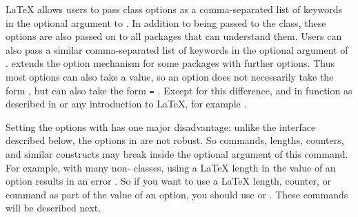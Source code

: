 \begin{Declaration}
\end{Declaration}
\LaTeX{} allows users to pass class options as a
comma-separated list of keywords in the optional argument to
. In addition to being passed to the class, these options
are also passed on to all packages that can
understand them. Users can also pass a similar comma-separated list of
keywords in the optional argument of . \KOMAScript{} extends the option mechanism for
 some packages with further options. Thus most \KOMAScript{} options can also
take a value, so an option does not necessarily take the form ,
but can also take the form \texttt{=}%
. Except for this difference,
 and  in \KOMAScript{} function as
described in \cite{latex:usrguide-historic} or any introduction to \LaTeX, for
example \cite{lshort}.


Setting the options with  has one
major disadvantage: unlike the interface described below, the options in 
 are not robust. So commands, lengths, counters, and
similar constructs may break inside the optional argument of this command.
For example, with many non-\KOMAScript{} classes, using a \LaTeX{} length
in the value of an option results in an error%
%
. So if you want to use a \LaTeX{} length, counter, or command as part of the
value of an option, you should use  or
. These commands will be described next.%
%
\EndIndexGroup


